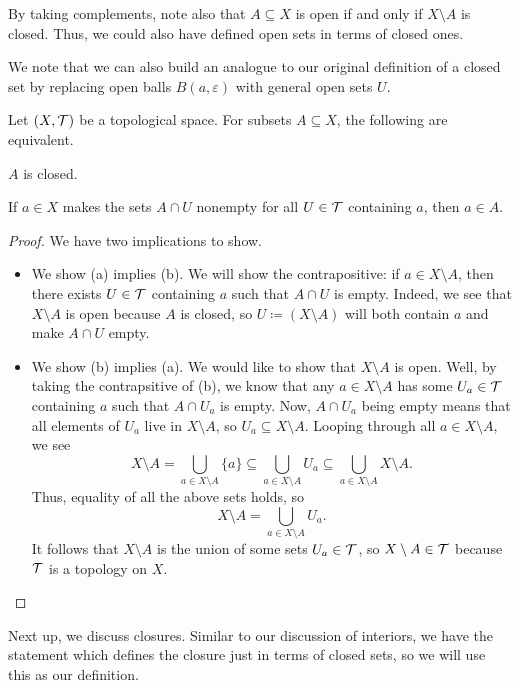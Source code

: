 \documentclass[../main.tex]{subfiles}
\begin{document}
\begin{remark}
    By taking complements, note also that $A\subseteq X$ is open if and only if $X\setminus A$ is closed. Thus, we could also have defined open sets in terms of closed ones.
\end{remark}
We note that we can also build an analogue to our original definition  of a closed set by replacing open balls $B(a,\varepsilon)$ with general open sets $U$.
\begin{proposition}
    Let $(X,\mathcal{T})$ be a topological space. For subsets $A\subseteq X$, the following are equivalent.
    \begin{listalph}
        \item $A$ is closed.
        \item If $a\in X$ makes the sets $A\cap U$ nonempty for all $U\in\mathcal{T}$ containing $a$, then $a\in A$.
    \end{listalph}
\end{proposition}
\begin{proof}
    We have two implications to show.
    \begin{itemize}
        \item We show (a) implies (b). We will show the contrapositive: if $a\in X\setminus A$, then there exists $U\in\mathcal{T}$ containing $a$ such that $A\cap U$ is empty. Indeed, we see that $X\setminus A$ is open because $A$ is closed, so $U\coloneqq(X\setminus A)$ will both contain $a$ and make $A\cap U$ empty.
        \item We show (b) implies (a). We would like to show that $X\setminus A$ is open. Well, by taking the contrapsitive of (b), we know that any $a\in X\setminus A$ has some $U_a\in\mathcal{T}$ containing $a$ such that $A\cap U_a$ is empty. Now, $A\cap U_a$ being empty means that all elements of $U_a$ live in $X\setminus A$, so $U_a\subseteq X\setminus A$. Looping through all $a\in X\setminus A$, we see
        \[X\setminus A=\bigcup_{a\in X\setminus A}\{a\}\subseteq\bigcup_{a\in X\setminus A}U_a\subseteq\bigcup_{a\in X\setminus A}X\setminus A.\]
        Thus, equality of all the above sets holds, so
        \[X\setminus A=\bigcup_{a\in X\setminus A}U_a.\]
        It follows that $X\setminus A$ is the union of some sets $U_a\in\mathcal{T}$, so $X\setminus A\in\mathcal{T}$ because $\mathcal{T}$ is a topology on $X$.
        \qedhere
    \end{itemize}
\end{proof}
Next up, we discuss closures. Similar to our discussion of interiors, we have the statement  which defines the closure just in terms of closed sets, so we will use this as our definition.
\end{document}
